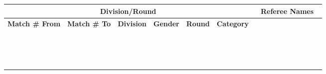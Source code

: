 \documentclass[letterpaper,12pt]{article}
\begin{document}
	
	
	\centering
	\footnotesize %
	\begin{tabular}{|p{1.5cm}|p{1.5cm}|p{4.5cm}|p{1.5cm}|p{1.5cm}|p{1.5cm}|
			p{0.75cm}|p{0.75cm}|p{0.75cm}|p{0.75cm}|p{0.75cm}|p{0.75cm}|p{0.75cm}|p{0.75cm}|p{0.75cm}|p{0.75cm}|}
		\hline
		\multicolumn{6}{|c|}{\textbf{Division/Round}} & \multicolumn{10}{c|}{\textbf{Referee Names}} \\
		\hline
		\centering\textbf{Match \# From} & \centering\textbf{Match \# To} & \centering\textbf{Division} & \centering\textbf{Gender} & \centering\textbf{Round} & \centering\textbf{Category} & & & & & & & & & & \\
		\hline
		& & & & & & & & & & & & & & & \\
		\hline
		& & & & & & & & & & & & & & & \\
		\hline
		& & & & & & & & & & & & & & & \\
		\hline
		& & & & & & & & & & & & & & & \\
		\hline
		& & & & & & & & & & & & & & & \\
		\hline
		& & & & & & & & & & & & & & & \\
		\hline
		& & & & & & & & & & & & & & & \\
		\hline
		& & & & & & & & & & & & & & & \\
		\hline
		& & & & & & & & & & & & & & & \\
		\hline
		& & & & & & & & & & & & & & & \\
		\hline
		& & & & & & & & & & & & & & & \\
		\hline
		& & & & & & & & & & & & & & & \\
		\hline
		& & & & & & & & & & & & & & & \\
		\hline
		& & & & & & & & & & & & & & & \\
		\hline
		& & & & & & & & & & & & & & & \\
		\hline
	\end{tabular}
	
\end{document}
